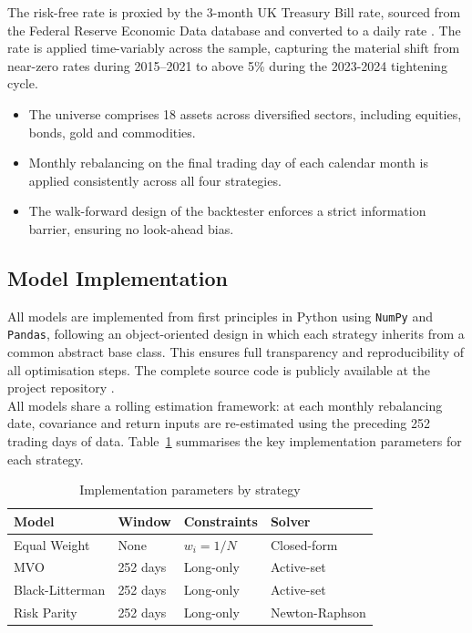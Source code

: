 \documentclass[a4paper,alpha-refs]{scr-contemporary}
\numberwithin{equation}{section}
\begin{document}
\indent The risk-free rate is proxied by the 3-month UK Treasury Bill rate,
sourced from the Federal Reserve Economic Data database and converted to
a daily rate \citeauthor{FRED}. The rate is applied time-variably across the sample, capturing the
material shift from near-zero rates during 2015--2021 to above 5\% during the
2023-2024 tightening cycle.

\begin{keypoints*}
\begin{itemize}
  \item The universe comprises 18 assets across diversified sectors, 
  including equities, bonds, gold and commodities.
  \item Monthly rebalancing on the final trading day of each calendar 
  month is applied consistently across all four strategies.
  \item The walk-forward design of the backtester enforces a strict information
  barrier, ensuring no look-ahead bias.
\end{itemize}
\end{keypoints*}

\subsection{Model Implementation}
\label{sec:model-implementation}
\indent \indent All models are implemented from first principles in Python using
\texttt{NumPy} and \texttt{Pandas}, following an object-oriented design in which
each strategy inherits from a common abstract base class. This ensures full
transparency and reproducibility of all optimisation steps. The complete source
code is publicly available at the project repository \citep{scr_repo}. \\
\indent All models share a rolling estimation framework: at each monthly rebalancing
date, covariance and return inputs are re-estimated using the preceding 252
trading days of data. Table~\ref{tab:implementation} summarises the key
implementation parameters for each strategy.

\begin{table}[h]
\centering
\caption{Implementation parameters by strategy}
\begin{tabular}{l l l l}
\toprule
\textbf{Model} & \textbf{Window} & \textbf{Constraints} & \textbf{Solver} \\
\midrule
Equal Weight    & None     & $w_i = 1/N$ & Closed-form    \\
MVO             & 252 days & Long-only   & Active-set     \\
Black-Litterman & 252 days & Long-only   & Active-set     \\
Risk Parity     & 252 days & Long-only   & Newton-Raphson \\
\bottomrule
\end{tabular}
\label{tab:implementation}
\end{table}
\end{document}
